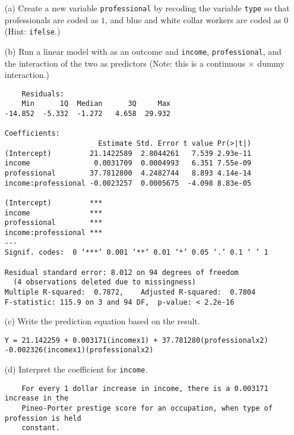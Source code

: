 \documentclass[12pt,letterpaper]{article}
\begin{document}
\newpage
\begin{enumerate}
	
	\item [(a)]
	Create a new variable \texttt{professional} by recoding the variable \texttt{type} so that professionals are coded as $1$, and blue and white collar workers are coded as $0$ (Hint: \texttt{ifelse}.)
	
	
	
	\item [(b)]
	Run a linear model with  as an outcome and \texttt{income}, \texttt{professional}, and the interaction of the two as predictors (Note: this is a continuous $\times$ dummy interaction.)
	
	\begin{verbatim}
	Residuals:
    Min      1Q  Median      3Q     Max 
-14.852  -5.332  -1.272   4.658  29.932 

Coefficients:
                      Estimate Std. Error t value Pr(>|t|)
(Intercept)         21.1422589  2.8044261   7.539 2.93e-11
income               0.0031709  0.0004993   6.351 7.55e-09
professional        37.7812800  4.2482744   8.893 4.14e-14
income:professional -0.0023257  0.0005675  -4.098 8.83e-05
                       
(Intercept)         ***
income              ***
professional        ***
income:professional ***
---
Signif. codes:  0 ‘***’ 0.001 ‘**’ 0.01 ‘*’ 0.05 ‘.’ 0.1 ‘ ’ 1

Residual standard error: 8.012 on 94 degrees of freedom
  (4 observations deleted due to missingness)
Multiple R-squared:  0.7872,	Adjusted R-squared:  0.7804 
F-statistic: 115.9 on 3 and 94 DF,  p-value: < 2.2e-16
	\end{verbatim}
	
	\item [(c)]
	Write the prediction equation based on the result.
\begin{verbatim}
Y = 21.142259 + 0.003171(incomex1) + 37.781280(professionalx2) 
-0.002326(incomex1)(professionalx2)
\end{verbatim}
	
\newpage
	\item [(d)]
	Interpret the coefficient for \texttt{income}.
	\begin{verbatim}
	For every 1 dollar increase in income, there is a 0.003171 increase in the 
	Pineo-Porter prestige score for an occupation, when type of profession is held 
	constant.
	\end{verbatim}
		

\end{enumerate}
\end{document}
